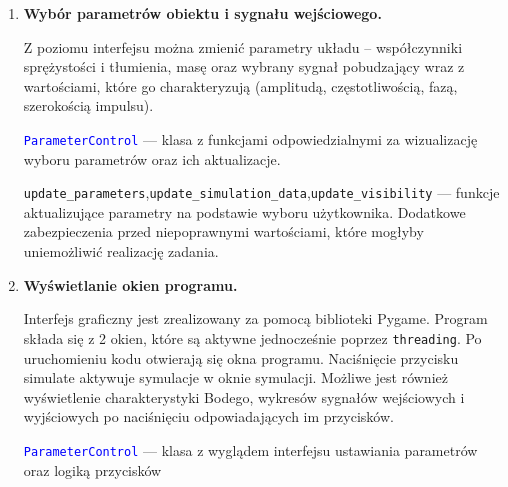 \documentclass[10pt, a4paper]{article}
\begin{document}
\begin{enumerate}[label=\alph*.]
  \item \textbf{Wybór parametrów obiektu i sygnału wejściowego.} \par\vspace{0.1cm}
  Z poziomu interfejsu można zmienić parametry układu – współczynniki sprężystości i tłumienia, masę oraz wybrany sygnał pobudzający wraz z wartościami, które go charakteryzują 
  (amplitudą, częstotliwością, fazą, szerokością impulsu). 

  \vspace{0.1cm}

  \textcolor{blue}{\texttt{ParameterControl}} --- klasa z funkcjami odpowiedzialnymi za wizualizację wyboru parametrów oraz ich aktualizacje.
  
  \vspace{0.1cm}

  {\texttt{update\_parameters}},{\texttt{update\_simulation\_data}},{\texttt{update\_visibility}} --- funkcje aktualizujące parametry na podstawie wyboru użytkownika.
  Dodatkowe zabezpieczenia przed niepoprawnymi wartościami, które mogłyby uniemożliwić realizację zadania.

  \vspace{0.2cm}
  
  \item \textbf{Wyświetlanie okien programu.} \par\vspace{0.1cm}
  Interfejs graficzny jest zrealizowany za pomocą biblioteki Pygame. Program składa się z 2 okien, które są aktywne jednocześnie poprzez {\texttt{threading}}. Po uruchomieniu kodu otwierają się okna programu. Naciśnięcie przycisku simulate aktywuje symulacje w oknie symulacji.
  Możliwe jest również wyświetlenie charakterystyki Bodego, wykresów sygnałów wejściowych i wyjściowych po naciśnięciu odpowiadających im przycisków.

  \vspace{0.1cm}

  \textcolor{blue}{\texttt{ParameterControl}} --- klasa z wyglądem interfejsu ustawiania parametrów oraz logiką przycisków


  \vspace{0.2cm}
  

\end{enumerate}
\end{document}
